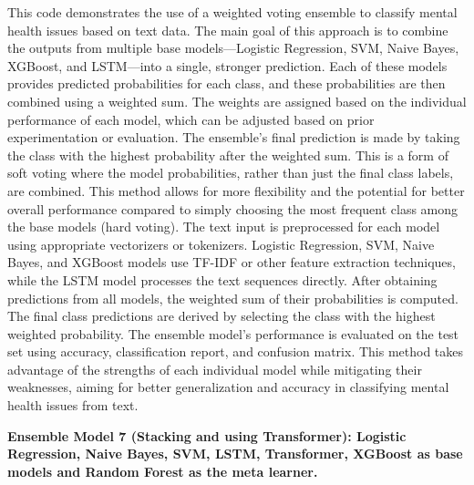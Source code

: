 \noindent
This code demonstrates the use of a weighted voting ensemble to classify mental health issues based on text data. The main goal of this approach is to combine the outputs from multiple base models—Logistic Regression, SVM, Naive Bayes, XGBoost, and LSTM—into a single, stronger prediction. Each of these models provides predicted probabilities for each class, and these probabilities are then combined using a weighted sum. The weights are assigned based on the individual performance of each model, which can be adjusted based on prior experimentation or evaluation. The ensemble's final prediction is made by taking the class with the highest probability after the weighted sum. This is a form of soft voting where the model probabilities, rather than just the final class labels, are combined. This method allows for more flexibility and the potential for better overall performance compared to simply choosing the most frequent class among the base models (hard voting). The text input is preprocessed for each model using appropriate vectorizers or tokenizers. Logistic Regression, SVM, Naive Bayes, and XGBoost models use TF-IDF or other feature extraction techniques, while the LSTM model processes the text sequences directly. After obtaining predictions from all models, the weighted sum of their probabilities is computed. The final class predictions are derived by selecting the class with the highest weighted probability. The ensemble model’s performance is evaluated on the test set using accuracy, classification report, and confusion matrix. This method takes advantage of the strengths of each individual model while mitigating their weaknesses, aiming for better generalization and accuracy in classifying mental health issues from text.

\pagebreak
\noindent
\textbf{Ensemble Model 7 (Stacking and using Transformer): Logistic Regression, Naive Bayes, SVM, LSTM, Transformer, XGBoost as base models and Random Forest as the meta learner. }

